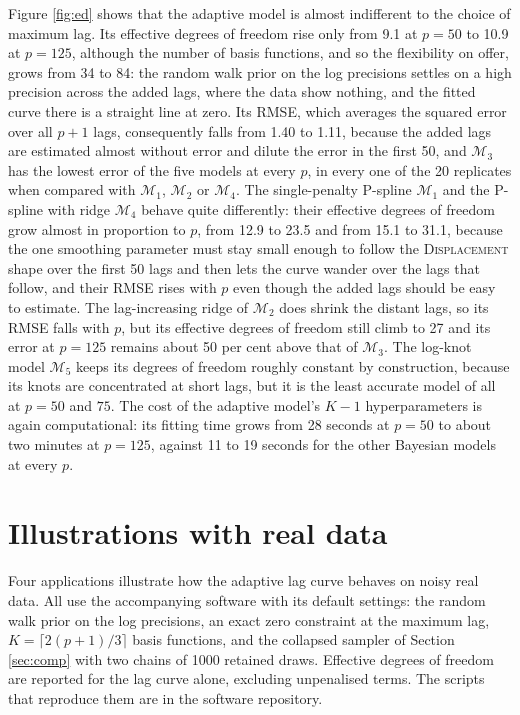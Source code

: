 \documentclass[11pt]{article}
\newcommand{\M}[1]{\mathcal{M}_{#1}}
\newcommand{\scen}[1]{\textsc{#1}}
\begin{document}
Figure \ref{fig:ed} shows that the adaptive model is almost indifferent to
the choice of maximum lag. Its effective degrees of freedom rise only from
9.1 at $p = 50$ to 10.9 at $p = 125$, although the number of basis
functions, and so the flexibility on offer, grows from 34 to 84: the random
walk prior on the log precisions settles on a high precision across the
added lags, where the data show nothing, and the fitted curve there is a
straight line at zero. Its RMSE, which averages the squared error over all
$p + 1$ lags, consequently falls from 1.40 to 1.11, because the added lags
are estimated almost without error and dilute the error in the first 50,
and $\M{3}$ has the lowest error of the five models at every $p$, in every
one of the 20 replicates when compared with $\M{1}$, $\M{2}$ or $\M{4}$. The
single-penalty P-spline $\M{1}$ and the P-spline with ridge $\M{4}$ behave
quite differently: their effective degrees of freedom grow almost in
proportion to $p$, from 12.9 to 23.5 and from 15.1 to 31.1, because the one
smoothing parameter must stay small enough to follow the
\scen{Displacement} shape over the first 50 lags and then lets the curve
wander over the lags that follow, and their RMSE rises with $p$ even though
the added lags should be easy to estimate. The lag-increasing ridge of
$\M{2}$ does shrink the distant lags, so its RMSE falls with $p$, but its
effective degrees of freedom still climb to 27 and its error at $p = 125$
remains about 50 per cent above that of $\M{3}$. The log-knot model $\M{5}$
keeps its degrees of freedom roughly constant by construction, because its
knots are concentrated at short lags, but it is the least accurate model of
all at $p = 50$ and $75$. The cost of the adaptive model's $K - 1$
hyperparameters is again computational: its fitting time grows from 28
seconds at $p = 50$ to about two minutes at $p = 125$, against 11 to 19
seconds for the other Bayesian models at every $p$.

\section{Illustrations with real data}
\label{sec:real}

Four applications illustrate how the adaptive lag curve behaves on noisy real
data. All use the accompanying software with its default settings: the random
walk prior on the log precisions, an exact zero constraint at the maximum lag,
$K = \lceil 2(p+1)/3 \rceil$ basis functions, and the collapsed sampler of
Section \ref{sec:comp} with two chains of 1000 retained draws. Effective degrees of freedom are
reported for the lag curve alone, excluding unpenalised terms. The scripts
that reproduce them are in the software repository.
\end{document}
